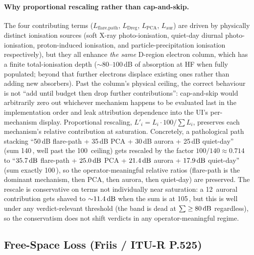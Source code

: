 \documentclass[11pt,a4paper]{article}
\newcommand{\SI}[2]{#1\,\text{#2}}
\newcommand{\dB}{\text{dB}}
\begin{document}
\paragraph{Why proportional rescaling rather than cap-and-skip.}
The four contributing terms ($L_{\text{flare,path}}$,
$L_{\text{Dreg}}$, $L_{\text{PCA}}$, $L_{\text{aur}}$) are driven
by physically distinct ionisation sources (soft X-ray
photo-ionisation, quiet-day diurnal photo-ionisation,
proton-induced ionisation, and particle-precipitation ionisation
respectively), but they all enhance \emph{the same} D-region
electron column, which has a finite total-ionisation depth
(${\sim}80$--$100$\,dB of absorption at HF when fully populated;
beyond that further electrons displace existing ones rather than
adding new absorbers). Past the column's physical ceiling, the
correct behaviour is not ``add until budget then drop further
contributions'': cap-and-skip would arbitrarily zero out whichever
mechanism happens to be evaluated last in the implementation order
and leak attribution dependence into the UI's per-mechanism
display. Proportional rescaling, $L'_i = L_i \cdot 100/\sum L_i$,
preserves each mechanism's relative contribution at saturation.
Concretely, a pathological path stacking
``50\,dB flare-path + 35\,dB PCA + 30\,dB aurora + 25\,dB
quiet-day'' (sum \SI{140}{\dB}, well past the
\SI{100}{\dB} ceiling) gets rescaled by the factor
$100/140 \approx 0.714$ to
``$\SI{35.7}{\dB}$ flare-path + $\SI{25.0}{\dB}$ PCA +
$\SI{21.4}{\dB}$ aurora + $\SI{17.9}{\dB}$ quiet-day'' (sum
exactly \SI{100}{\dB}), so the operator-meaningful relative
ratios (flare-path is the dominant mechanism, then PCA, then
aurora, then quiet-day) are preserved.  The rescale is
conservative on terms not individually near saturation: a
\SI{12}{\dB} auroral contribution gets shaved to
${\sim}\SI{11.4}{\dB}$ when the sum is at \SI{105}{\dB}, but
this is well under any verdict-relevant threshold (the band
is dead at $\sum \ge \SI{80}{\dB}$ regardless), so the
conservatism does not shift verdicts in any
operator-meaningful regime.

\subsection{Free-Space Loss (Friis / ITU-R P.525)}
\end{document}
